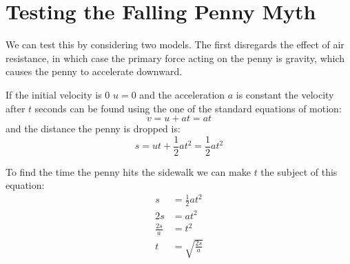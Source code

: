 \documentclass[12pt letter]{report}
\begin{document}
\section{Testing the Falling Penny Myth}



We can test this by considering two models. The first disregards the effect of air resistance, in which case the
primary force acting on the penny is gravity, which causes the penny to accelerate downward.

If the initial velocity is 0 $u = 0$ and the acceleration $a$ is constant the velocity after $t$ seconds can be found
using the one of the standard equations of motion:
\[
  v = u + at = at
\]
and the distance the penny is dropped is:
\[
  s = ut + \frac{1}{2} a t^2 = \frac{1}{2} at^2
\]

To find the time the penny hits the sidewalk we can make $t$ the subject of this equation:
\begin{align*}
  s            & = \frac{1}{2} at^2    \\
  2s           & = at^2                \\
  \frac{2s}{a} & = t^2                 \\
  t            & = \sqrt{\frac{2s}{a}}
\end{align*}
\end{document}
